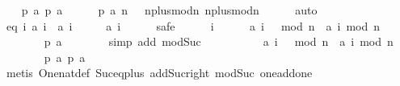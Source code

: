 \begin{isabellebody}
\ \ \isamarkupfalse%
\ {\isachardoublequoteopen}{\isacharquery}p{}\ {\isacharquery}a{\isachardoublequoteclose}\ {\isachardoublequoteopen}{\isacharquery}p{}\ {\isacharquery}a{\isachardoublequoteclose}\isanewline
\ \ \ \ \isamarkupfalse%
\ {\isacharbackquoteopen}{\isacharquery}p{}\ a{\isacharbackquoteclose}\ {\isacharbackquoteopen}n\ {\isasymge}\ {}{\isacharbackquoteclose}\ n{\isacharunderscore}plus{\isacharunderscore}{}{\isacharunderscore}mod{\isacharunderscore}n\ n{\isacharunderscore}plus{\isacharunderscore}{}{\isacharunderscore}mod{\isacharunderscore}n\isanewline
\ \ \ \ \isamarkupfalse%
\ auto\isanewline
\isanewline
\ \ \isamarkupfalse%
\ eq{\isacharcolon}\ {\isachardoublequoteopen}{\isasymforall}i{\isachardot}\ {\isacharquery}a\ i\ {\isacharasterisk}\ {\isacharquery}a\ {\isacharparenleft}i\ {\isacharplus}\ {}{\isacharparenright}\ {\isacharplus}\ {}\ {\isacharequal}\ {\isacharquery}a\ {\isacharparenleft}i\ {\isacharplus}\ {}{\isacharparenright}{\isachardoublequoteclose}\isanewline
\ \ \isamarkupfalse%
\ safe\isanewline
\ \ \ \ \isamarkupfalse%
\ i\isanewline
\ \ \ \ \isamarkupfalse%
\ {\isachardoublequoteopen}a\ {\isacharparenleft}{\isacharparenleft}i\ {\isacharplus}\ {}{\isacharparenright}\ mod\ n{\isacharparenright}\ {\isacharequal}\ a\ {\isacharparenleft}i\ mod\ n\ {\isacharplus}\ {}{\isacharparenright}{\isachardoublequoteclose}\isanewline
\ \ \ \ \ \ \isamarkupfalse%
\ {\isacharbackquoteopen}{\isacharquery}p{}\ a{\isacharbackquoteclose}\isanewline
\ \ \ \ \ \ \isamarkupfalse%
\ {\isacharparenleft}simp\ add{\isacharcolon}\ mod{\isacharunderscore}Suc{\isacharparenright}\isanewline
\isanewline
\ \ \ \ \isamarkupfalse%
\isanewline
\isanewline
\ \ \ \ \isamarkupfalse%
\ {\isachardoublequoteopen}a\ {\isacharparenleft}{\isacharparenleft}i\ {\isacharplus}\ {}{\isacharparenright}\ mod\ n{\isacharparenright}\ {\isacharequal}\ a\ {\isacharparenleft}i\ mod\ n\ {\isacharplus}\ {}{\isacharparenright}{\isachardoublequoteclose}\isanewline
\ \ \ \ \ \ \isamarkupfalse%
\ {\isacharbackquoteopen}{\isacharquery}p{}\ a{\isacharbackquoteclose}\ {\isacharbackquoteopen}{\isacharquery}p{}\ a{\isacharbackquoteclose}\isanewline
\ \ \ \ \ \ \isamarkupfalse%
\ {\isacharparenleft}metis\ One{\isacharunderscore}nat{\isacharunderscore}def\ Suc{\isacharunderscore}eq{\isacharunderscore}plus{}\ add{\isacharunderscore}Suc{\isacharunderscore}right\ mod{\isacharunderscore}Suc\ one{\isacharunderscore}add{\isacharunderscore}one{\isacharparenright}\isanewline

\end{isabellebody}
